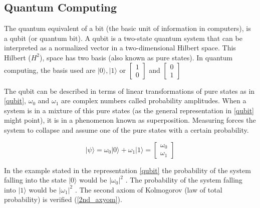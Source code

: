 
\subsection{Quantum Computing}
\label{subsec:int_quantum_computing}





The quantum equivalent of a bit (the basic unit of information in computers), is a qubit (or quantum bit). A qubit is a two-state quantum system that can be interpreted as a normalized vector in a two-dimensional Hilbert space. This Hilbert ($H^2$), space has two basis (also known as pure states). In quantum computing, the basis used are ${ \vert 0 \rangle , \vert 1 \rangle }$ or $\left[\begin{array}{c}
1\\
0
\end{array}\right]$
 and 
$\left[\begin{array}{c}
0\\
1
\end{array}\right]$ 

The qubit can be described in terms of linear transformations of pure states as in \eqref{qubit}, $\omega_{0}$ and $\omega_{1}$ are complex numbers called probability amplitudes. When a system is in a mixture of this pure states (as the general representation in \eqref{qubit} might point), it is in a phenomenon known as superposition. Measuring forces the system to collapse and assume one of the pure states with a certain probability. 

\begin{equation}
\label{qubit}
\vert \psi \rangle = \omega_{0}\vert0\rangle+\omega_{1}\vert1\rangle = \left[\begin{array}{c}
\omega_{0}\\
\omega_{1}
\end{array}\right]
\end{equation}

In the example stated in the representation \eqref{qubit} the probability of the system falling into the state $\vert 0 \rangle $ would be $\vert\omega_{0}\vert^{2}$ . The probability of the system falling into $\vert 1 \rangle $ would be $\vert\omega_{1}\vert^{2}$ . The second axiom of Kolmogorov (law of total probability) is verified (\eqref{2nd_axyom}).

